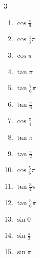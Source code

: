\begin{multicols}{3}
\begin{enumerate}
  \item $\displaystyle \cos{\frac{\pi}{6}}$

  \item $\displaystyle \cos{\frac{4}{3}\pi}$

  \item $\displaystyle \cos{\pi}$
        \phantom{$\displaystyle =-1$}

  \item $\displaystyle \tan{\pi}$
        \phantom{$\displaystyle =0$}

  \item $\displaystyle \tan{\frac{7}{6}\pi}$

  \item $\displaystyle \tan{\frac{\pi}{6}}$

  \item $\displaystyle \cos{\frac{\pi}{4}}$

  \item $\displaystyle \tan{\pi}$
        \phantom{$\displaystyle =0$}

\columnbreak %

\resetques

  \item $\displaystyle \tan{\frac{\pi}{2}}$
        \phantom{$\displaystyle \quad なし$}

  \item $\displaystyle \cos{\frac{5}{6}\pi}$

  \item $\displaystyle \tan{\frac{3}{4}\pi}$
        \phantom{$\displaystyle =-1$}

  \item $\displaystyle \tan{\frac{5}{6}\pi}$

  \item $\displaystyle \sin{0}$
        \phantom{$\displaystyle =0$}

  \item $\displaystyle \sin{\frac{\pi}{2}}$
        \phantom{$\displaystyle =1$}

  \item $\displaystyle \sin{\pi}$
        \phantom{$\displaystyle =0$}


\end{enumerate}
\end{multicols}
